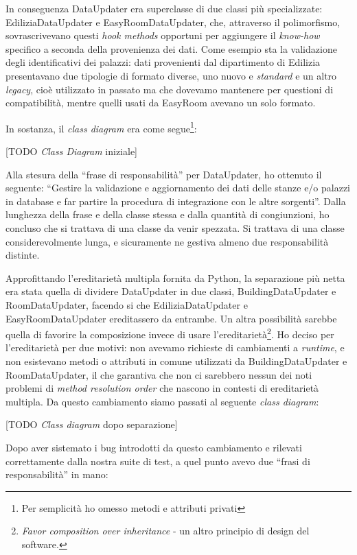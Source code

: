 \documentclass[12pt]{report}
\begin{document}
In conseguenza DataUpdater era superclasse di due classi più specializzate: 
EdiliziaDataUpdater e EasyRoomDataUpdater, che, attraverso il polimorfismo,
sovrascrivevano questi \textit{hook methods} opportuni per aggiungere 
il \textit{know-how} specifico a seconda della provenienza dei dati. 
Come esempio sta la validazione degli identificativi dei palazzi: 
dati provenienti dal dipartimento di Edilizia presentavano due
tipologie di formato diverse, uno nuovo e \textit{standard} e un altro 
\textit{legacy}, cioè utilizzato in passato ma che dovevamo mantenere per
questioni di compatibilità, mentre quelli usati da EasyRoom avevano un solo formato.

In sostanza, il \textit{class diagram} era come segue\footnote{Per 
semplicità ho omesso metodi e attributi privati}:

[TODO \textit{Class Diagram} iniziale]

Alla stesura della ``frase di responsabilità'' per DataUpdater, ho ottenuto il seguente: 
``Gestire la validazione e aggiornamento dei dati delle stanze 
e/o palazzi in database e far partire la procedura di integrazione
con le altre sorgenti''. 
Dalla lunghezza della frase e della classe stessa e dalla quantità di 
congiunzioni, ho concluso che si trattava di una classe da venir 
spezzata. Si trattava di una classe considerevolmente lunga, 
e sicuramente ne gestiva almeno due responsabilità distinte.

Approfittando l'ereditarietà multipla fornita da Python, la separazione più netta
era stata quella di dividere DataUpdater in due classi, 
BuildingDataUpdater e RoomDataUpdater, facendo si che EdiliziaDataUpdater 
e EasyRoomDataUpdater ereditassero da entrambe. Un altra possibilità 
sarebbe quella di favorire la composizione invece di usare l'ereditarietà\footnote{
\textit{Favor composition over inheritance} - un altro principio di design del software.
}. 
Ho deciso per l'ereditarietà per due motivi: non avevamo richieste di 
cambiamenti a \textit{runtime}, e non esistevano metodi o attributi 
in comune utilizzati da BuildingDataUpdater e RoomDataUpdater, il che garantiva 
che non ci sarebbero nessun dei noti problemi di \textit{method resolution 
order} che nascono in contesti di ereditarietà multipla. Da questo cambiamento
siamo passati al seguente \textit{class diagram}:

[TODO \textit{Class diagram} dopo separazione]

Dopo aver sistemato i bug introdotti da questo cambiamento e rilevati 
correttamente dalla nostra suite di test, a quel punto avevo due 
``frasi di responsabilità'' in mano:
\end{document}
